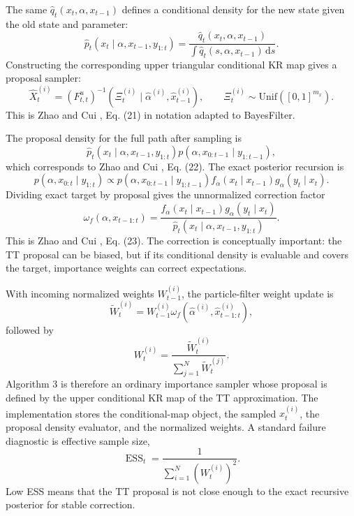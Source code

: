 \documentclass[11pt]{article}
\newcommand{\dd}{\,\mathrm d}
\begin{document}
The same \(\widehat q_t(x_t,\alpha,x_{t-1})\) defines a conditional density for
the new state given the old state and parameter:
\[
    \widehat p_t(x_t\mid \alpha,x_{t-1},y_{1:t})
    =
    \frac{\widehat q_t(x_t,\alpha,x_{t-1})}
    {\int \widehat q_t(s,\alpha,x_{t-1})\dd s}.
    \label{eq:p24-f1}
\]
Constructing the corresponding upper triangular conditional KR map gives a
proposal sampler:
\[
    \widehat X_t^{(i)}
    =
    (F_{t,t}^{u})^{-1}
    \left(\Xi_t^{(i)}\mid \widehat\alpha^{(i)},\widehat x_{t-1}^{(i)}\right),
    \qquad
    \Xi_t^{(i)}\sim\mathrm{Unif}([0,1]^{m_x}).
    \label{eq:p24-f2}
\]
This is Zhao and Cui \cite{zhao2024ttsequential}, Eq. (21) in notation adapted to BayesFilter.

The proposal density for the full path after sampling is
\[
    \widehat p_t(x_t\mid \alpha,x_{t-1},y_{1:t})
    p(\alpha,x_{0:t-1}\mid y_{1:t-1}),
    \label{eq:p24-f3}
\]
which corresponds to Zhao and Cui \cite{zhao2024ttsequential}, Eq. (22).  The exact posterior recursion is
\[
    p(\alpha,x_{0:t}\mid y_{1:t})
    \propto
    p(\alpha,x_{0:t-1}\mid y_{1:t-1})
    f_\alpha(x_t\mid x_{t-1})
    g_\alpha(y_t\mid x_t).
\]
Dividing exact target by proposal gives the unnormalized correction factor
\[
    \omega_f(\alpha,x_{t-1:t})
    =
    \frac{
    f_\alpha(x_t\mid x_{t-1})g_\alpha(y_t\mid x_t)}
    {\widehat p_t(x_t\mid \alpha,x_{t-1},y_{1:t})}.
    \label{eq:p24-f4}
\]
This is Zhao and Cui \cite{zhao2024ttsequential}, Eq. (23).  The correction is conceptually important: the TT
proposal can be biased, but if its conditional density is evaluable and covers
the target, importance weights can correct expectations.

With incoming normalized weights \(W_{t-1}^{(i)}\), the particle-filter weight
update is
\[
    \widetilde W_t^{(i)}
    =
    W_{t-1}^{(i)}
    \omega_f(\widehat\alpha^{(i)},\widehat x_{t-1:t}^{(i)}),
    \label{eq:p24-f5}
\]
followed by
\[
    W_t^{(i)}
    =
    \frac{\widetilde W_t^{(i)}}
    {\sum_{j=1}^{N}\widetilde W_t^{(j)}}.
    \label{eq:p24-f6}
\]
Algorithm 3 is therefore an ordinary importance sampler whose proposal is
defined by the upper conditional KR map of the TT approximation.  The
implementation stores the conditional-map object, the sampled \(x_t^{(i)}\),
the proposal density evaluator, and the normalized weights.  A standard failure
diagnostic is effective sample size,
\[
    \operatorname{ESS}_t
    =
    \frac{1}{\sum_{i=1}^{N}(W_t^{(i)})^2}.
    \label{eq:p24-f7}
\]
Low ESS means that the TT proposal is not close enough to the exact recursive
posterior for stable correction.
\end{document}
